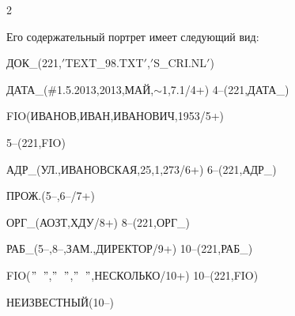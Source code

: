 \begin{multicols}{2}
 \medskip





 Его содержательный портрет имеет следующий вид:





 \medskip





{\small





\noindent


 ДОК\_(221,$'$TEXT\_98.TXT$'$,$'$S\_CRI.NL$'$)





\noindent


 ДАТА\_(\#1.5.2013,2013,МАЙ,$\sim$1,7.1/4+) 4--(221,ДАТА\_)





\noindent


 FIO(ИВАНОВ,ИВАН,ИВАНОВИЧ,1953/5+)





  5--(221,FIO)





\noindent


 АДР\_(УЛ.,ИВАНОВСКАЯ,25,1,273/6+) 6--(221,АДР\_)





 \noindent


 ПРОЖ.(5--,6--/7+)





 \noindent


 ОРГ\_(АОЗТ,ХДУ/8+) 8--(221,ОРГ\_)





 \noindent


 РАБ\_(5--,8--,ЗАМ.,ДИРЕКТОР/9+) 10--(221,РАБ\_)





 \noindent


 FIO($"$\ $"$,$"$\ $"$,$"$\ $"$,НЕСКОЛЬКО/10+) 10--(221,FIO)





 \noindent


 НЕИЗВЕСТНЫЙ(10--)





}
\end{multicols}
